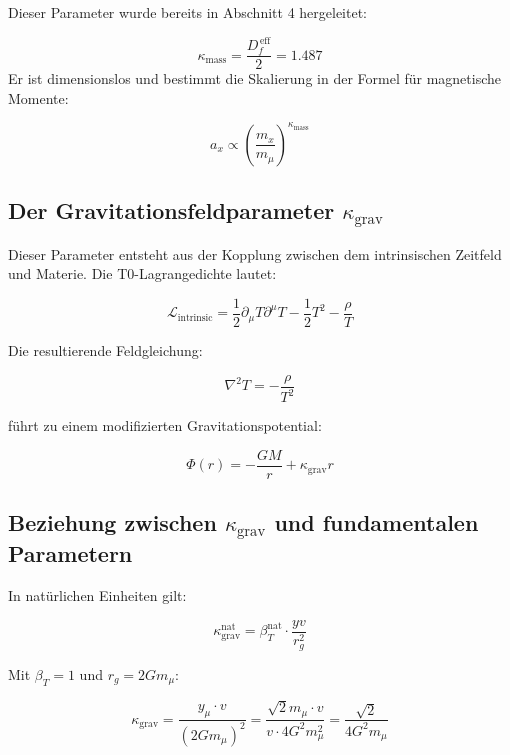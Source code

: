	Dieser Parameter wurde bereits in Abschnitt 4 hergeleitet:
	
	\begin{equation}
		\kappa_{\text{mass}} = \frac{D_f^{\,\text{eff}}}{2} = 1.487
	\end{equation}
	Er ist dimensionslos und bestimmt die Skalierung in der Formel für magnetische Momente:
	
	\begin{equation}
		a_x \propto \left(\frac{m_x}{m_\mu}\right)^{\kappa_{\text{mass}}}
	\end{equation}
	
	\subsection{Der Gravitationsfeldparameter $\kappa_{\text{grav}}$}
	
	Dieser Parameter entsteht aus der Kopplung zwischen dem intrinsischen Zeitfeld und Materie. Die T0-Lagrangedichte lautet:
	
	\begin{equation}
		\mathcal{L}_{\text{intrinsic}} = \frac{1}{2}\partial_\mu T \partial^\mu T - \frac{1}{2}T^2 - \frac{\rho}{T}
	\end{equation}
	
	Die resultierende Feldgleichung:
	
	\begin{equation}
		\nabla^2 T = -\frac{\rho}{T^2}
	\end{equation}
	
	führt zu einem modifizierten Gravitationspotential:
	
	\begin{equation}
		\Phi(r) = -\frac{GM}{r} + \kappa_{\text{grav}} r
	\end{equation}
	
	\subsection{Beziehung zwischen $\kappa_{\text{grav}}$ und fundamentalen Parametern}
	
	In natürlichen Einheiten gilt:
	
	\begin{equation}
		\kappa_{\text{grav}}^{\text{nat}} = \beta_T^{\text{nat}} \cdot \frac{yv}{r_g^2}
	\end{equation}
	
	Mit $\beta_T = 1$ und $r_g = 2Gm_\mu$:
	
	\begin{equation}
		\kappa_{\text{grav}} = \frac{y_\mu \cdot v}{(2Gm_\mu)^2} = \frac{\sqrt{2} m_\mu \cdot v}{v \cdot 4G^2m_\mu^2} = \frac{\sqrt{2}}{4G^2m_\mu}
	\end{equation}
	
